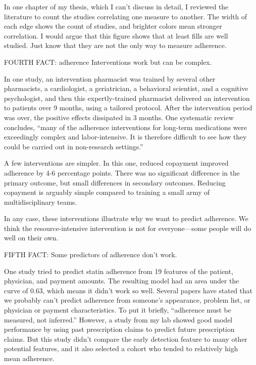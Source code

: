 \documentclass[12pt]{report}
\begin{document}
\begin{large}
In one chapter of my thesis, which I can't discuss in detail, I
reviewed the literature to count the studies correlating one measure
to another. The width of each edge shows the count of studies, and
brighter colors mean stronger correlation. I would argue that this
figure shows that at least fills are well studied. Just know that they
are not the only way to measure adherence.

FOURTH FACT: adherence Interventions work but can be complex.

In one study, an intervention pharmacist was trained by several other
pharmacists, a cardiologist, a geriatrician, a behavioral scientist,
and a cognitive psychologist, and then this expertly-trained
pharmacist delivered an intervention to patients over 9 months, using
a tailored protocol. After the intervention period was over, the
positive effects dissipated in 3 months. One systematic review
concludes, ``many of the adherence interventions for long-term
medications were exceedingly complex and labor-intensive. It is
therefore difficult to see how they could be carried out in
non-research settings.''

A few interventions are simpler. In this one, reduced copayment
improved adherence by 4-6 percentage points. There was no significant
difference in the primary outcome, but small differences in secondary
outcomes. Reducing copayment is arguably simple compared to training a
small army of multidisciplinary teams.

In any case, these interventions illustrate why we want to predict
adherence. We think the resource-intensive intervention is not for
everyone---some people will do well on their own.

FIFTH FACT: Some predictors of adherence don't work.

One study tried to predict statin adherence from 19 features of the
patient, physician, and payment amounts. The resulting model had an
area under the curve of 0.63, which means it didn't work so well.
Several papers have stated that we probably can't predict adherence
from someone's appearance, problem list, or physician or payment
characteristics. To put it briefly, ``adherence must be measured, not
inferred.'' However, a study from my lab showed good model performance
by using past prescription claims to predict future prescription
claims. But this study didn't compare the early detection feature to
many other potential features, and it also selected a cohort who
tended to relatively high mean adherence.


\end{large}
\end{document}
